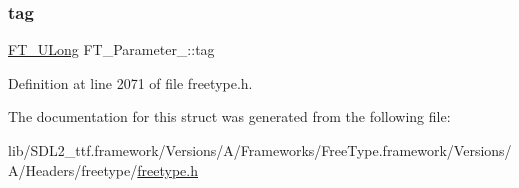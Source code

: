 \subsubsection{\texorpdfstring{tag}{tag}}
{\footnotesize\ttfamily \mbox{\hyperlink{fttypes_8h_a4fac88bdba78eb76b505efa6e4fbf3f5}{F\+T\+\_\+\+U\+Long}} F\+T\+\_\+\+Parameter\+\_\+\+::tag}



Definition at line 2071 of file freetype.\+h.



The documentation for this struct was generated from the following file\+:\begin{DoxyCompactItemize}
\item 
lib/\+S\+D\+L2\+\_\+ttf.\+framework/\+Versions/\+A/\+Frameworks/\+Free\+Type.\+framework/\+Versions/\+A/\+Headers/freetype/\mbox{\hyperlink{freetype_8h}{freetype.\+h}}\end{DoxyCompactItemize}
